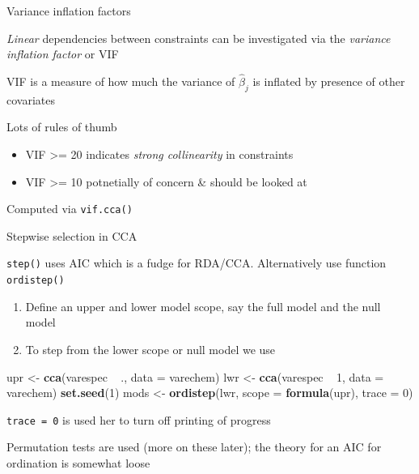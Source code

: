\documentclass[10pt,ignorenonframetext,compress, aspectratio=169]{beamer}
\newenvironment{Shaded}{\begin{snugshade}}{\end{snugshade}}
\newcommand{\KeywordTok}[1]{\textcolor[rgb]{0.13,0.29,0.53}{\textbf{{#1}}}}
\newcommand{\DataTypeTok}[1]{\textcolor[rgb]{0.13,0.29,0.53}{{#1}}}
\newcommand{\DecValTok}[1]{\textcolor[rgb]{0.00,0.00,0.81}{{#1}}}
\newcommand{\StringTok}[1]{\textcolor[rgb]{0.31,0.60,0.02}{{#1}}}
\newcommand{\NormalTok}[1]{{#1}}
\begin{document}
\begin{frame}{Variance inflation factors}

\emph{Linear} dependencies between constraints can be investigated via
the \emph{variance inflation factor} or VIF

VIF is a measure of how much the variance of $\hat{\beta}_j$ is inflated
by presence of other covariates

Lots of rules of thumb

\begin{itemize}
\itemsep1pt\parskip0pt
\item
  VIF \textgreater{}= 20 indicates \emph{strong collinearity} in
  constraints
\item
  VIF \textgreater{}= 10 potnetially of concern \& should be looked at
\end{itemize}

Computed via \texttt{vif.cca()}

\end{frame}

\begin{frame}[fragile]{Stepwise selection in CCA}

\texttt{step()} uses AIC which is a fudge for RDA/CCA. Alternatively use
function \texttt{ordistep()}

\begin{enumerate}
\def\labelenumi{\arabic{enumi}.}
\itemsep1pt\parskip0pt
\item
  Define an upper and lower model scope, say the full model and the null
  model
\item
  To step from the lower scope or null model we use
\end{enumerate}

\scriptsize

\begin{Shaded}
\begin{Highlighting}[]
\NormalTok{upr <-}\StringTok{ }\KeywordTok{cca}\NormalTok{(varespec ~}\StringTok{ }\NormalTok{., }\DataTypeTok{data =} \NormalTok{varechem)}
\NormalTok{lwr <-}\StringTok{ }\KeywordTok{cca}\NormalTok{(varespec ~}\StringTok{ }\DecValTok{1}\NormalTok{, }\DataTypeTok{data =} \NormalTok{varechem)}
\KeywordTok{set.seed}\NormalTok{(}\DecValTok{1}\NormalTok{)}
\NormalTok{mods <-}\StringTok{ }\KeywordTok{ordistep}\NormalTok{(lwr, }\DataTypeTok{scope =} \KeywordTok{formula}\NormalTok{(upr), }\DataTypeTok{trace =} \DecValTok{0}\NormalTok{)}
\end{Highlighting}
\end{Shaded}

\normalsize

\texttt{trace = 0} is used her to turn off printing of progress

Permutation tests are used (more on these later); the theory for an AIC
for ordination is somewhat loose

\end{frame}
\end{document}
